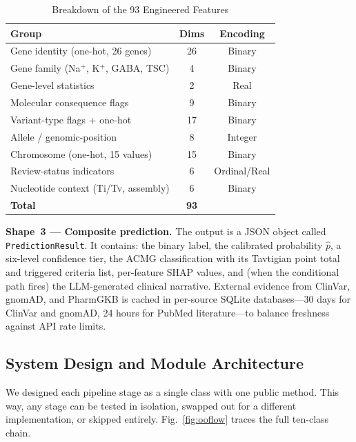 \documentclass[12pt,a4paper]{article}
\begin{document}
\begin{table}[H]
\caption{Breakdown of the 93 Engineered Features}
\label{tab:featuregroups}
\begin{center}
\begin{tabular}{lcc}
\toprule
\textbf{Group} & \textbf{Dims} & \textbf{Encoding} \\
\midrule
Gene identity (one-hot, 26 genes)             & 26 & Binary \\
Gene family (Na$^+$, K$^+$, GABA, TSC)       &  4 & Binary \\
Gene-level statistics                         &  2 & Real \\
Molecular consequence flags                   &  9 & Binary \\
Variant-type flags + one-hot                  & 17 & Binary \\
Allele / genomic-position                     &  8 & Integer \\
Chromosome (one-hot, 15 values)               & 15 & Binary \\
Review-status indicators                      &  6 & Ordinal/Real \\
Nucleotide context (Ti/Tv, assembly)          &  6 & Binary \\
\midrule
\textbf{Total}                                & \textbf{93} & \\
\bottomrule
\end{tabular}
\end{center}
\end{table}

\textbf{Shape~3 --- Composite prediction.}
The output is a JSON object called \texttt{PredictionResult}. It
contains: the binary label, the calibrated probability $\hat{p}$,
a six-level confidence tier, the ACMG classification with its
Tavtigian point total and triggered criteria list, per-feature SHAP
values, and (when the conditional path fires) the LLM-generated
clinical narrative. External evidence from ClinVar, gnomAD, and
PharmGKB is cached in per-source SQLite databases---30 days for
ClinVar and gnomAD, 24 hours for PubMed literature---to balance
freshness against API rate limits.

\subsection{System Design and Module Architecture}

We designed each pipeline stage as a single class with one public
method. This way, any stage can be tested in isolation, swapped out
for a different implementation, or skipped entirely.
Fig.~\ref{fig:ooflow} traces the full ten-class chain.
\end{document}
